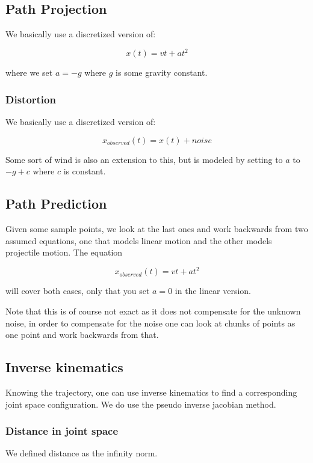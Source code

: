 \documentclass[letterpaper, 10 pt, conference]{ieeeconf}  %
\begin{document}
\subsection{Path Projection}

We basically use a discretized version of:

\[
  x(t) = vt + at^2
\]

where we set $a = -g$ where $g$ is some gravity constant.

\subsubsection{Distortion}

We basically use a discretized version of:

\[
  x_{observed}(t) = x(t) + noise
\]

Some sort of wind is also an extension to this, but is modeled by setting to
$a$ to $-g+c$ where $c$ is constant.

\subsection{Path Prediction}

Given some sample points, we look at the last ones and work backwards from two
assumed equations, one that models linear motion and the other models
projectile motion. The equation

\[
  x_{observed}(t) = vt + at^2
\]

will cover both cases, only that you set $a=0$ in the linear version.

Note that this is of course not exact as it does not compensate for the unknown
noise, in order to compensate for the noise one can look at chunks of points as
one point and work backwards from that.

\subsection{Inverse kinematics}

Knowing the trajectory, one can use inverse kinematics to find a corresponding
joint space configuration. We do use the pseudo inverse jacobian method.

\subsubsection{Distance in joint space}

We defined distance as the infinity norm.
\end{document}
